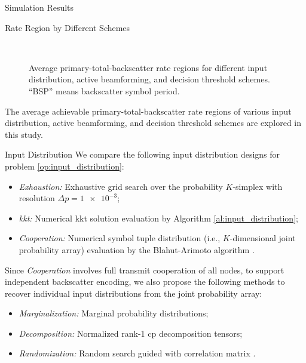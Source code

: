 \documentclass[journal]{IEEEtran}
\begin{document}
\begin{section}{Simulation Results}
	\begin{subsection}{Rate Region by Different Schemes}
		\begin{figure}[!t]
			\centering
			\\
			\caption{
				Average primary-total-backscatter rate regions for different input distribution, active beamforming, and decision threshold schemes.
				``BSP'' means backscatter symbol period.
			}
		\end{figure}
		The average achievable primary-total-backscatter rate regions of various input distribution, active beamforming, and decision threshold schemes are explored in this study.

		\begin{subsubsection}{Input Distribution}
			We compare the following input distribution designs for problem \eqref{op:input_distribution}:
			\begin{itemize}
				\item \emph{Exhaustion:} Exhaustive grid search over the probability $K$-simplex with resolution $\Delta p = \num{1e-3}$;
				\item \emph{\gls{kkt}:} Numerical \gls{kkt} solution evaluation by Algorithm \ref{al:input_distribution};
				\item \emph{Cooperation:} Numerical symbol tuple distribution (i.e., $K$-dimensional joint probability array) evaluation by the Blahut-Arimoto algorithm \cite{Arimoto1972,Blahut1972a}.
			\end{itemize}

			Since \emph{Cooperation} involves full transmit cooperation of all nodes, to support independent backscatter encoding, we also propose the following methods to recover individual input distributions from the joint probability array:
			\begin{itemize}
				\item \emph{Marginalization:} Marginal probability distributions;
				\item \emph{Decomposition:} Normalized rank-\num{1} \gls{cp} decomposition tensors;
				\item \emph{Randomization:} Random search guided with correlation matrix \cite{Calvo2010}.
			\end{itemize}


\end{subsubsection}
\end{subsection}
\end{section}
\end{document}
